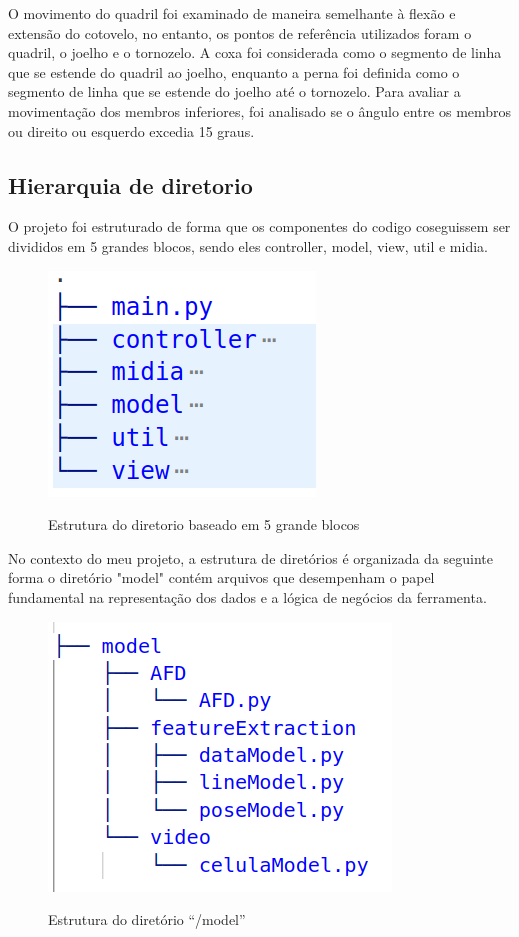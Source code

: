  O movimento do quadril foi examinado de maneira semelhante à flexão e extensão do cotovelo, no entanto, os pontos de referência utilizados foram o quadril, o joelho e o tornozelo. A coxa foi considerada como o segmento de linha que se estende do quadril ao joelho, enquanto a perna foi definida como o segmento de linha que se estende do joelho até o tornozelo. Para avaliar a movimentação dos membros inferiores, foi analisado se o ângulo entre os membros ou direito ou esquerdo excedia 15 graus.






\subsection[Hierarquia de diretorio]{Hierarquia de diretorio}


O projeto foi estruturado de forma que os componentes do codigo coseguissem ser divididos em  5 grandes blocos, sendo eles controller, model, view, util e midia. 

\begin{figure}[H]
	\centering
    \caption{Estrutura do diretorio baseado em 5 grande blocos }
	\includegraphics[scale=0.5]{figuras/diretorios/Blocos.png}
	\label{fig:blocos}
\end{figure}

No contexto do meu projeto, a estrutura de diretórios é organizada da seguinte forma o diretório "model" contém arquivos que desempenham o papel fundamental na representação dos dados e a lógica de negócios da ferramenta.

\begin{figure}[H]
    \centering
    \caption{Estrutura do diretório ``/model''}
    \includegraphics[scale=0.5]{figuras/diretorios/model.png}
    \label{fig:model}
\end{figure}



